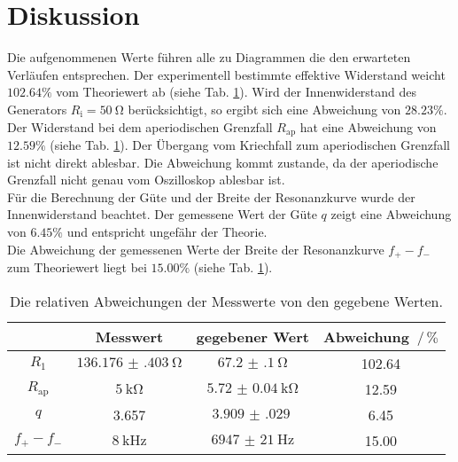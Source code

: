 \section{Diskussion}
\label{sec:Diskussion}

Die aufgenommenen Werte führen alle zu Diagrammen die den erwarteten Verläufen entsprechen.
Der experimentell bestimmte effektive Widerstand weicht $102.64 \%$ vom Theoriewert ab (siehe Tab. \ref{tab:fehler}).
Wird der Innenwiderstand des Generators $R_\text{i}=\SI{50}{\ohm}$ berücksichtigt, so ergibt sich eine Abweichung von $28.23 \%$.
\\
Der Widerstand bei dem aperiodischen Grenzfall $R_\text{ap}$ hat eine Abweichung von $12.59 \%$ (siehe Tab. \ref{tab:fehler}).
Der Übergang vom Kriechfall zum aperiodischen Grenzfall ist nicht direkt ablesbar.
Die Abweichung kommt zustande, da der aperiodische Grenzfall nicht genau vom Oszilloskop ablesbar ist.
\\
Für die Berechnung der Güte und der Breite der Resonanzkurve wurde der Innenwiderstand beachtet.
Der gemessene Wert der Güte $q$ zeigt eine Abweichung von $6.45 \%$ und entspricht ungefähr der Theorie.
\\
Die Abweichung der gemessenen Werte der Breite der Resonanzkurve $f_+ - f_-$ zum Theoriewert liegt bei $15.00 \%$ (siehe Tab. \ref{tab:fehler}).
\\

\begin{table}
\centering
\caption{Die relativen Abweichungen der Messwerte von den gegebene Werten.}
\begin{tabular}{cccc}
\toprule
 & Messwert & gegebener Wert & Abweichung $ \,/\, \%$ \\
\midrule
$R_1$ &  $\SI{136.176(403)}{\ohm}$ & $\SI{67.2(1)}{\ohm}$ & 102.64 \\
$R_\text{ap}$ & $\SI{5}{\kilo\ohm}$ & $\SI{5.72(4)}{\kilo\ohm}$ & 12.59 \\
$q$ & 3.657 & $\SI{3.909(029)}{}$ & 6.45 \\
$f_{+}- f_{-}$ & $\SI{8}{\kilo\hertz}$ & $\SI{6947(21)}{\hertz}$ & 15.00 \\
\bottomrule
\end{tabular}
\label{tab:fehler}
\end{table}